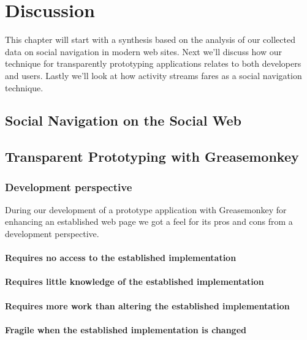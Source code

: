 \chapter{Discussion}
\label{chapter:discussion}

This chapter will start with a synthesis based on the analysis of our
collected data on social navigation in modern web sites.
Next we'll discuss how our technique for transparently prototyping
applications relates to both developers and users. Lastly we'll look at how
activity streams fares as a social navigation technique.

\section{Social Navigation on the Social Web}

\section{Transparent Prototyping with Greasemonkey}

\subsection{Development perspective}

During our development of a prototype application with Greasemonkey for
enhancing an established web page we got a feel for its pros and cons from a
development perspective.

\subsubsection{Requires no access to the established implementation}

\subsubsection{Requires little knowledge of the established implementation}

\subsubsection{Requires more work than altering the established
  implementation}

\subsubsection{Fragile when the established implementation is changed}

